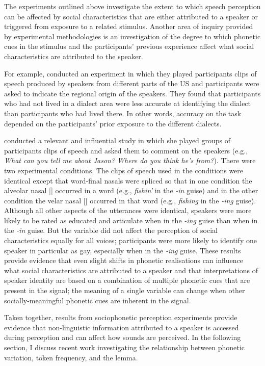 The experiments outlined above investigate the extent to which speech perception can be affected by social characteristics that are either attributed to a speaker or triggered from exposure to a related stimulus.  Another area of inquiry provided by experimental methodologies is an investigation of the degree to which phonetic cues in the stimulus and the participants' previous experience affect what social characteristics are attributed to the speaker.  

For example,  conducted an experiment in which they played participants clips of speech produced by speakers from different parts of the US and participants were asked to indicate the regional origin of the speakers.  They found that participants who had not lived in a dialect area were less accurate at identifying the dialect than participants who had lived there.  In other words, accuracy on the task depended on the participants' prior exposure to the different dialects.  

 conducted a relevant and influential study in which she played groups of participants clips of speech and asked them to comment on the speakers (e.g., \textit{What can you tell me about Jason?  Where do you think he's from?}).  There were two experimental conditions.  The clips of speech used in the conditions were identical except that word-final nasals were spliced so that in one condition the alveolar nasal [] occurred in a word (e.g., \textit{fishin'} in the \textit{-in} guise) and in the other condition the velar nasal [] occurred in that word (e.g., \textit{fishing} in the \textit{-ing} guise).  Although all other aspects of the utterances were identical, speakers were more likely to be rated as educated and articulate when in the \textit{-ing} guise than when in the \textit{-in} guise.  But the variable did not affect the perception of social characteristics equally for all voices; participants were more likely to identify one speaker in particular as gay, especially when in the \textit{-ing} guise.  These results provide evidence that even slight shifts in phonetic realisations can influence what social characteristics are attributed to a speaker and that interpretations of speaker identity are based on a combination of multiple phonetic cues that are present in the signal; the meaning of a single variable can change when other socially-meaningful phonetic cues are inherent in the signal.

Taken together, results from sociophonetic perception experiments provide evidence that non-linguistic information attributed to a speaker is accessed during perception and can affect how sounds are perceived.  In the following section, I discuss recent work investigating the relationship between phonetic variation, token frequency, and the lemma.

